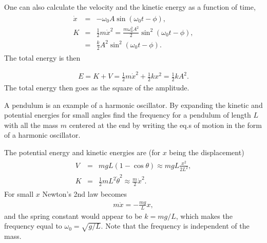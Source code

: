 \documentclass[letterpaper,10pt,english]{sphinxmanual}
\begin{document}
One can also calculate the velocity and the kinetic energy as a function of time,
\begin{equation*}
\begin{split}
\begin{eqnarray}
\dot{x}&=&-\omega_0A\sin(\omega_0 t-\phi),\\
\nonumber
K&=&\frac{1}{2}m\dot{x}^2=\frac{m\omega_0^2A^2}{2}\sin^2(\omega_0t-\phi),\\
\nonumber
&=&\frac{k}{2}A^2\sin^2(\omega_0t-\phi).
\end{eqnarray}
\end{split}
\end{equation*}
The total energy is then




\begin{equation*}
\begin{split}
\begin{equation}
E=K+V=\frac{1}{2}m\dot{x}^2+\frac{1}{2}kx^2=\frac{1}{2}kA^2.
\label{_auto38} \tag{48}
\end{equation}
\end{split}
\end{equation*}
The total energy then goes as the square of the amplitude.

A pendulum is an example of a harmonic oscillator. By expanding the
kinetic and potential energies for small angles find the frequency for
a pendulum of length \(L\) with all the mass \(m\) centered at the end by
writing the eq.s of motion in the form of a harmonic oscillator.

The potential energy and kinetic energies are (for \(x\) being the displacement)
\begin{equation*}
\begin{split}
\begin{eqnarray*}
V&=&mgL(1-\cos\theta)\approx mgL\frac{x^2}{2L^2},\\
K&=&\frac{1}{2}mL^2\dot{\theta}^2\approx \frac{m}{2}\dot{x}^2.
\end{eqnarray*}
\end{split}
\end{equation*}
For small \(x\) Newton’s 2nd law becomes
\begin{equation*}
\begin{split}
m\ddot{x}=-\frac{mg}{L}x,
\end{split}
\end{equation*}
and the spring constant would appear to be \(k=mg/L\), which makes the
frequency equal to \(\omega_0=\sqrt{g/L}\). Note that the frequency is
independent of the mass.
\end{document}
